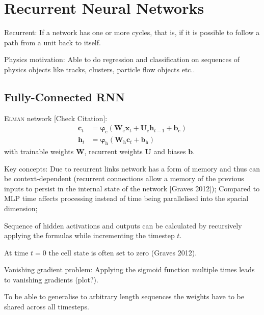 \section{Recurrent Neural Networks}
\label{sec:rnn}

Recurrent: If a network has one or more cycles, that is, if it is possible to
follow a path from a unit back to itself.

Physics motivation: Able to do regression and classification on sequences of
physics objects like tracks, clusters, particle flow objects etc..

\subsection{Fully-Connected RNN}
\label{sec:fully_connected_rnn}


\textsc{Elman} network [Check Citation]\cite{elman, graves}:
\begin{align*}
  \mathbf{c}_t &= \bm{\varphi}_{\text{c}}\left( \mathbf{W}_{\text{c}} \mathbf{x}_{t} + \mathbf{U}_{\text{c}} \mathbf{h}_{t-1} + \mathbf{b}_{\text{c}} \right) \\
  \mathbf{h}_t &= \bm{\varphi}_{\text{h}}\left( \mathbf{W}_{\text{h}} \mathbf{c}_{t} + \mathbf{b}_{\text{h}} \right)
\end{align*}
 with
trainable weights $\mathbf{W}$, recurrent weights $\mathbf{U}$ and biases
$\mathbf{b}$.

Key concepts: Due to recurrent links network has a form of memory and thus can
be context-dependent (recurrent connections allow a memory of the previous
inputs to persist in the internal state of the network [Graves
2012]\cite{graves}); Compared to MLP time affects processing instead of time
being parallelised into the spacial dimension;

Sequence of hidden activations and outputs can be calculated by recursively
applying the formulas while incrementing the timestep $t$.

At time $t=0$ the cell state is often set to zero (Graves 2012).

Vanishing gradient problem: Applying the sigmoid function multiple times leads
to vanishing gradients (plot?).

To be able to generalise to arbitrary length sequences the weights have to be
shared across all timesteps.

